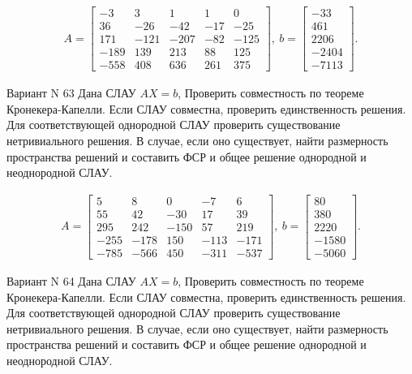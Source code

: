 \documentclass[11pt]{report}
\begin{document}
\begin{align*}
 A = \left[\begin{matrix}-3 & 3 & 1 & 1 & 0\\36 & -26 & -42 & -17 & -25\\171 & -121 & -207 & -82 & -125\\-189 & 139 & 213 & 88 & 125\\-558 & 408 & 636 & 261 & 375\end{matrix}\right],
\ b = \left[\begin{matrix}-33\\461\\2206\\-2404\\-7113\end{matrix}\right]. 
 \end{align*}

Вариант N 63
Дана СЛАУ $AX = b$,
Проверить совместность по теореме Кронекера-Капелли. Если СЛАУ совместна, проверить единственность решения.
Для соответствующей однородной СЛАУ проверить существование нетривиального решения. В случае, если оно существует,
найти размерность пространства решений и составить ФСР и общее решение однородной  и неоднородной СЛАУ.


\begin{align*}
 A = \left[\begin{matrix}5 & 8 & 0 & -7 & 6\\55 & 42 & -30 & 17 & 39\\295 & 242 & -150 & 57 & 219\\-255 & -178 & 150 & -113 & -171\\-785 & -566 & 450 & -311 & -537\end{matrix}\right],
\ b = \left[\begin{matrix}80\\380\\2220\\-1580\\-5060\end{matrix}\right]. 
 \end{align*}

Вариант N 64
Дана СЛАУ $AX = b$,
Проверить совместность по теореме Кронекера-Капелли. Если СЛАУ совместна, проверить единственность решения.
Для соответствующей однородной СЛАУ проверить существование нетривиального решения. В случае, если оно существует,
найти размерность пространства решений и составить ФСР и общее решение однородной  и неоднородной СЛАУ.
\end{document}
